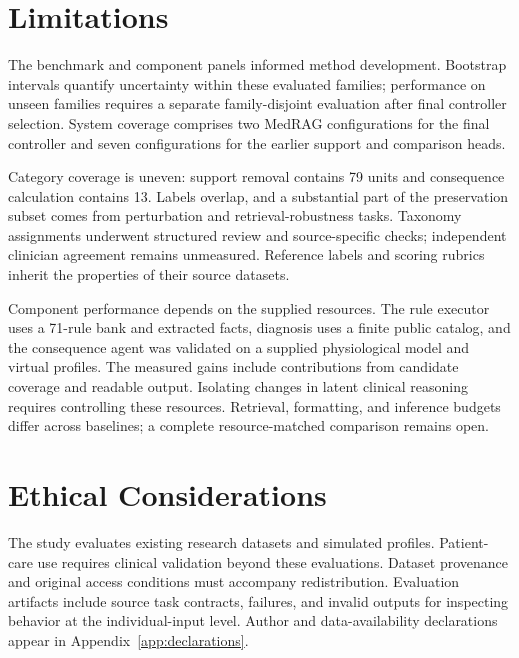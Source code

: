 \section*{Limitations}

The benchmark and component panels informed method development. Bootstrap intervals quantify uncertainty within these evaluated families; performance on unseen families requires a separate family-disjoint evaluation after final controller selection. System coverage comprises two MedRAG configurations for the final controller and seven configurations for the earlier support and comparison heads.

Category coverage is uneven: support removal contains 79 units and consequence calculation contains 13. Labels overlap, and a substantial part of the preservation subset comes from perturbation and retrieval-robustness tasks. Taxonomy assignments underwent structured review and source-specific checks; independent clinician agreement remains unmeasured. Reference labels and scoring rubrics inherit the properties of their source datasets.

Component performance depends on the supplied resources. The rule executor uses a 71-rule bank and extracted facts, diagnosis uses a finite public catalog, and the consequence agent was validated on a supplied physiological model and virtual profiles. The measured gains include contributions from candidate coverage and readable output. Isolating changes in latent clinical reasoning requires controlling these resources. Retrieval, formatting, and inference budgets differ across baselines; a complete resource-matched comparison remains open.

\section*{Ethical Considerations}
The study evaluates existing research datasets and simulated profiles. Patient-care use requires clinical validation beyond these evaluations. Dataset provenance and original access conditions must accompany redistribution. Evaluation artifacts include source task contracts, failures, and invalid outputs for inspecting behavior at the individual-input level. Author and data-availability declarations appear in Appendix~\ref{app:declarations}.

